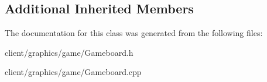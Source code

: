 \subsection*{Additional Inherited Members}


The documentation for this class was generated from the following files\-:\begin{DoxyCompactItemize}
\item 
client/graphics/game/Gameboard.\-h\item 
client/graphics/game/Gameboard.\-cpp\end{DoxyCompactItemize}
